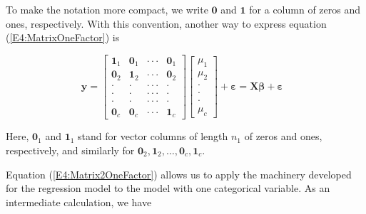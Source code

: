 To make the notation more compact, we write $\mathbf{0}$ and
$\mathbf{1}$ for a column of zeros and ones, respectively. With this
convention, another way to express equation
(\ref{E4:MatrixOneFactor}) is

\begin{center}
\begin{equation}\label{E4:Matrix2OneFactor}
\mathbf{y}=%
\begin{bmatrix}
\mathbf{1}_1 & \mathbf{0}_1 & \cdot \cdot \cdot  & \mathbf{0}%
_{1} \\
\mathbf{0}_{2} & \mathbf{1}_2 & \cdot \cdot \cdot  & \mathbf{0}%
_{2} \\
\cdot  & \cdot  & \cdot \cdot \cdot  & \cdot  \\
\cdot  & \cdot  & \cdot \cdot \cdot  & \cdot  \\
\cdot  & \cdot  & \cdot \cdot \cdot  & \cdot  \\
\mathbf{0}_c & \mathbf{0}_c & \cdot \cdot \cdot  & \mathbf{1}_c
\end{bmatrix}
\begin{bmatrix}
\mu _{1} \\
\mu _{2} \\
\cdot  \\
\cdot  \\
\cdot  \\
\mu _{c}%
\end{bmatrix}%
+\boldsymbol \varepsilon =\mathbf{X \boldsymbol \beta +\boldsymbol
\varepsilon }\text{ \ \ \ }
\end{equation}
\end{center}


\noindent Here, $\mathbf{0}_{1}$ and $\mathbf{1}_{1}$ stand for
vector columns of
length $n_{1}$ of zeros and ones, respectively, and similarly for $\mathbf{0}%
_{2}, \mathbf{1}_2, \ldots, \mathbf{0}_c, \mathbf{1}_c$.

Equation (\ref{E4:Matrix2OneFactor}) allows us to apply the
machinery developed for the regression model to the model with one
categorical variable. As an intermediate calculation, we have


